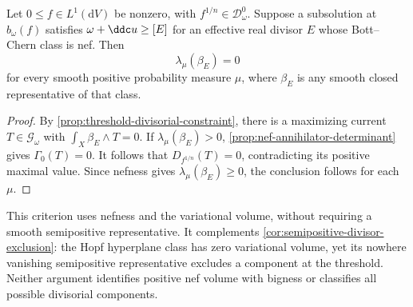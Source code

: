 \begin{corollary}\label{cor:nef-divisor-threshold-volume}
Let $0\leq f\in L^1(\mathrm{d}V)$ be nonzero, with $f^{1/n}\in\mathcal D_\omega^0$. Suppose a subsolution at $b_\omega(f)$ satisfies $\omega+\ddc u\geq[E]$ for an effective real divisor $E$ whose Bott--Chern class is nef. Then
\[
 \lambda_\mu(\beta_E)=0
\]
for every smooth positive probability measure $\mu$, where $\beta_E$ is any smooth closed representative of that class.
\end{corollary}
\begin{proof}
By \cref{prop:threshold-divisorial-constraint}, there is a maximizing current $T\in\mathscr G_\omega$ with $\int_X\beta_E\wedge T=0$. If $\lambda_\mu(\beta_E)>0$, \cref{prop:nef-annihilator-determinant} gives $\Gamma_0(T)=0$. It follows that $D_{f^{1/n}}(T)=0$, contradicting its positive maximal value. Since nefness gives $\lambda_\mu(\beta_E)\geq0$, the conclusion follows for each $\mu$.
\end{proof}

This criterion uses nefness and the variational volume, without requiring a smooth semipositive representative. It complements \cref{cor:semipositive-divisor-exclusion}: the Hopf hyperplane class has zero variational volume, yet its nowhere vanishing semipositive representative excludes a component at the threshold. Neither argument identifies positive nef volume with bigness or classifies all possible divisorial components.

